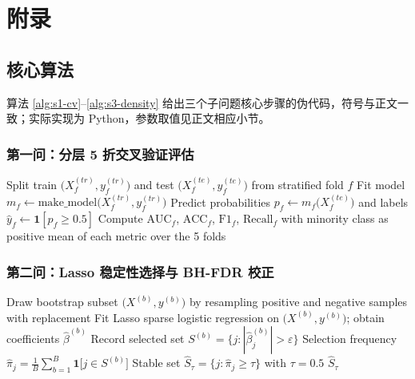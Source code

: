 \section{附录}
\label{sec:appendix}

\subsection{核心算法}

算法 \ref{alg:s1-cv}--\ref{alg:s3-density} 给出三个子问题核心步骤的伪代码，符号与正文一致；实际实现为 Python，参数取值见正文相应小节。

\subsubsection{第一问：分层 5 折交叉验证评估}

\begin{algorithm}[H]
\caption{分层 5 折交叉验证评估（第一问，主模型 L2）}
\label{alg:s1-cv}
\begin{algorithmic}[1]
    \State Split train $\big(X^{(tr)}_f, y^{(tr)}_f\big)$ and test $\big(X^{(te)}_f, y^{(te)}_f\big)$ from stratified fold $f$
    \State Fit model $m_f \gets \mathrm{make\_model}\big(X^{(tr)}_f, y^{(tr)}_f\big)$
    \State Predict probabilities $p_f \gets m_f\big(X^{(te)}_f\big)$ and labels $\hat{y}_f \gets \mathbf{1}[p_f \ge 0.5]$
    \State Compute $\mathrm{AUC}_f$, $\mathrm{ACC}_f$, $\mathrm{F1}_f$, $\mathrm{Recall}_f$ with minority class as positive
  \EndFor
  \State \Return mean of each metric over the 5 folds
\EndProcedure
\end{algorithmic}
\end{algorithm}

\subsubsection{第二问：Lasso 稳定性选择与 BH-FDR 校正}

\begin{algorithm}[H]
\caption{Lasso 稀疏 Logistic 稳定性选择（第二问）}
\label{alg:s2-stable}
\begin{algorithmic}[1]
    \State Draw bootstrap subset $\big(X^{(b)}, y^{(b)}\big)$ by resampling positive and negative samples with replacement
    \State Fit Lasso sparse logistic regression on $\big(X^{(b)}, y^{(b)}\big)$; obtain coefficients $\hat{\beta}^{(b)}$
    \State Record selected set $S^{(b)} = \big\{ j : |\hat{\beta}^{(b)}_j| > \varepsilon \big\}$
  \EndFor
  \State Selection frequency $\hat{\pi}_j = \tfrac{1}{B}\sum_{b=1}^{B}\mathbf{1}\big[j \in S^{(b)}\big]$
  \State Stable set $\hat{S}_\tau = \big\{ j : \hat{\pi}_j \ge \tau \big\}$ with $\tau = 0.5$
  \State \Return $\hat{S}_\tau$
\EndProcedure
\end{algorithmic}
\end{algorithm}

